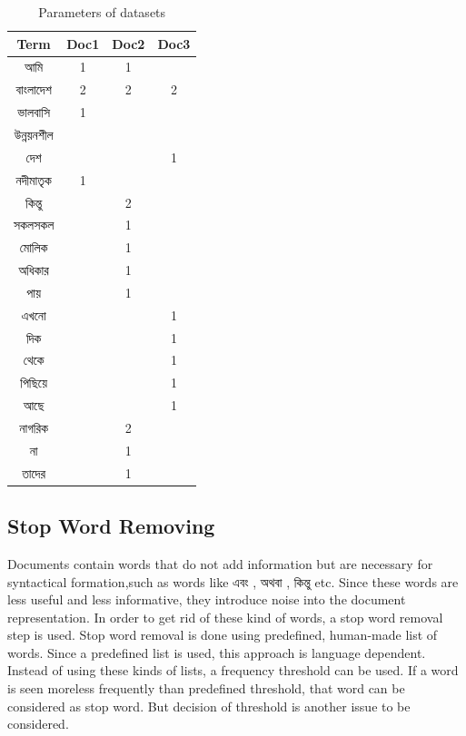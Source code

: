 \begin{table}[htp]	
\centering

  \caption{Parameters of datasets }
\vspace{0.5cm}
\begin{tabular}{|c|c|c|c|} 
\hline

Term & 	Doc1 & Doc2 & Doc3  \\ \hline
{\unicodefont আমি} 		& 1 & 1 &	   \\ \hline
{\unicodefont বাংলাদেশ}	& 2 & 2 & 2   \\ \hline
{\unicodefont ভালবাসি }	& 1 &  &   \\ \hline
{\unicodefont উন্নয়নশীল } 	&  &  &   \\ \hline
{\unicodefont দেশ } 	&  &  & 1  \\ \hline
{\unicodefont নদীমাতৃক }  & 1 &  &   \\ \hline
{\unicodefont কিন্তু}	&  & 2 &   \\ \hline
{\unicodefont সকল}সকল	&  & 1 &   \\ \hline
{\unicodefont মোলিক}	&  & 1 &   \\ \hline
{\unicodefont অধিকার}	&  & 1 &   \\ \hline
{\unicodefont পায়}	&  & 1 &   \\ \hline
{\unicodefont এখনো}	&  &  & 1  \\ \hline
{\unicodefont দিক}  &  &  & 1 \\ \hline
{\unicodefont থেকে} &  &  & 1 \\ \hline
{\unicodefont পিছিয়ে}&  &  & 1 \\ \hline
{\unicodefont আছে}&  &  & 1 \\ \hline
{\unicodefont নাগরিক}&  & 2 &  \\ \hline
{\unicodefont না} &  & 1 &  \\ \hline
{\unicodefont তাদের}&  & 1 &  \\ \hline

\end{tabular}
\label{tab:tab1}
\end{table}



\subsection{Stop Word Removing}
Documents contain words that do not add information but are necessary for syntactical formation,such as words like {\unicodefont এবং , অথবা , কিন্তু } etc. Since these words are less useful and less informative,  they introduce  noise into the document representation. In order to get rid of these kind of words, a stop word removal step is used.  Stop word removal is done using predefined, human-made list of words. Since a predefined list is used, this approach is language dependent. Instead of using these kinds of lists, a frequency threshold can be used. If a word is seen more\/less frequently than predefined threshold, that word can be considered as stop word. But decision of threshold is another issue to be considered.

